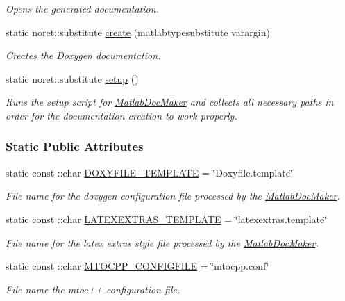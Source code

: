 \begin{DoxyCompactItemize}
\begin{DoxyCompactList}\small\item\em Opens the generated documentation. \end{DoxyCompactList}\item 
static noret\+::substitute \hyperlink{class_matlab_doc_maker_ad140908baecf279ebe64dc7c17f32b51}{create} (matlabtypesubstitute varargin)
\begin{DoxyCompactList}\small\item\em Creates the Doxygen documentation. \end{DoxyCompactList}\item 
\mbox{\label{class_matlab_doc_maker_a4ea0d0f724d201bba3448cc579624e35}} 
static noret\+::substitute \hyperlink{class_matlab_doc_maker_a4ea0d0f724d201bba3448cc579624e35}{setup} ()
\begin{DoxyCompactList}\small\item\em Runs the setup script for \hyperlink{class_matlab_doc_maker}{Matlab\+Doc\+Maker} and collects all necessary paths in order for the documentation creation to work properly. \end{DoxyCompactList}\end{DoxyCompactItemize}
\subsubsection*{Static Public Attributes}
\begin{DoxyCompactItemize}
\item 
static const \+::char \hyperlink{class_matlab_doc_maker_a3a93527b0b6a2361ce74938b4f631b1f}{D\+O\+X\+Y\+F\+I\+L\+E\+\_\+\+T\+E\+M\+P\+L\+A\+TE} = \char`\"{}Doxyfile.\+template\char`\"{}
\begin{DoxyCompactList}\small\item\em File name for the doxygen configuration file processed by the \hyperlink{class_matlab_doc_maker}{Matlab\+Doc\+Maker}. \end{DoxyCompactList}\item 
static const \+::char \hyperlink{class_matlab_doc_maker_a7098bea4dc0a3eea782a026f966a4d0d}{L\+A\+T\+E\+X\+E\+X\+T\+R\+A\+S\+\_\+\+T\+E\+M\+P\+L\+A\+TE} = \char`\"{}latexextras.\+template\char`\"{}
\begin{DoxyCompactList}\small\item\em File name for the latex extras style file processed by the \hyperlink{class_matlab_doc_maker}{Matlab\+Doc\+Maker}. \end{DoxyCompactList}\item 
static const \+::char \hyperlink{class_matlab_doc_maker_a56e0e68444b800bc37eb5d9e9deeade0}{M\+T\+O\+C\+P\+P\+\_\+\+C\+O\+N\+F\+I\+G\+F\+I\+LE} = \char`\"{}mtocpp.\+conf\char`\"{}
\begin{DoxyCompactList}\small\item\em File name the mtoc++ configuration file. \end{DoxyCompactList}\end{DoxyCompactItemize}


